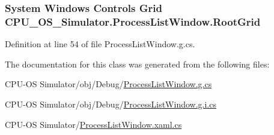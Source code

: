 \subsubsection[{Root\+Grid}]{\setlength{\rightskip}{0pt plus 5cm}System Windows Controls Grid C\+P\+U\+\_\+\+O\+S\+\_\+\+Simulator.\+Process\+List\+Window.\+Root\+Grid\hspace{0.3cm}{\ttfamily [package]}}\label{class_c_p_u___o_s___simulator_1_1_process_list_window_af216af01608102c81507d1f29399ec1a}


Definition at line 54 of file Process\+List\+Window.\+g.\+cs.



The documentation for this class was generated from the following files\+:\begin{DoxyCompactItemize}
\item 
C\+P\+U-\/\+O\+S Simulator/obj/\+Debug/\hyperlink{_process_list_window_8g_8cs}{Process\+List\+Window.\+g.\+cs}\item 
C\+P\+U-\/\+O\+S Simulator/obj/\+Debug/\hyperlink{_process_list_window_8g_8i_8cs}{Process\+List\+Window.\+g.\+i.\+cs}\item 
C\+P\+U-\/\+O\+S Simulator/\hyperlink{_process_list_window_8xaml_8cs}{Process\+List\+Window.\+xaml.\+cs}\end{DoxyCompactItemize}
